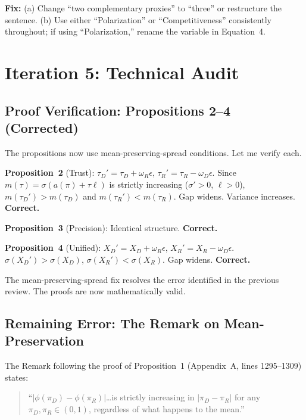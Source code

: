 \documentclass[11pt]{article}
\begin{document}
\begin{minorbox}
\textbf{Fix:} (a) Change ``two complementary proxies'' to ``three'' or restructure the sentence. (b) Use either ``Polarization'' or ``Competitiveness'' consistently throughout; if using ``Polarization,'' rename the variable in Equation~4.
\end{minorbox}

\section{Iteration 5: Technical Audit}
\label{sec:tech}

\subsection{Proof Verification: Propositions 2--4 (Corrected)}

The propositions now use mean-preserving-spread conditions. Let me verify each.

\textbf{Proposition~2} (Trust): $\tau_D' = \tau_D + \omega_R\epsilon$, $\tau_R' = \tau_R - \omega_D\epsilon$. Since $m(\tau) = \sigma(a(\pi) + \tau\ell)$ is strictly increasing ($\sigma' > 0$, $\ell > 0$), $m(\tau_D') > m(\tau_D)$ and $m(\tau_R') < m(\tau_R)$. Gap widens. Variance increases. \textbf{Correct.}

\textbf{Proposition~3} (Precision): Identical structure. \textbf{Correct.}

\textbf{Proposition~4} (Unified): $X_D' = X_D + \omega_R\epsilon$, $X_R' = X_R - \omega_D\epsilon$. $\sigma(X_D') > \sigma(X_D)$, $\sigma(X_R') < \sigma(X_R)$. Gap widens. \textbf{Correct.}

The mean-preserving-spread fix resolves the error identified in the previous review. The proofs are now mathematically valid.

\subsection{Remaining Error: The Remark on Mean-Preservation}

The Remark following the proof of Proposition~1 (Appendix~A, lines 1295--1309) states:

\begin{quote}
``$|\phi(\pi_D) - \phi(\pi_R)|$\ldots is strictly increasing in $|\pi_D - \pi_R|$ for any $\pi_D, \pi_R \in (0,1)$, regardless of what happens to the mean.''
\end{quote}
\end{document}
